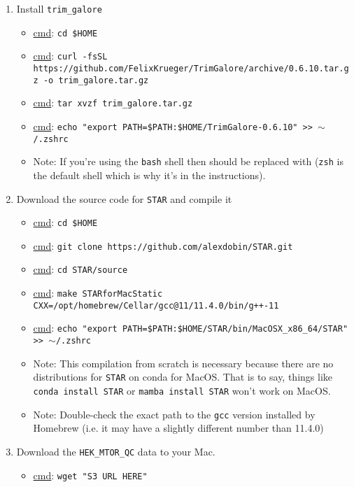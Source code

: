 \documentclass{article}
\begin{document}
\begin{enumerate}
        \item Install \texttt{trim\_galore}
        \begin{itemize}
            \item \underline{cmd}: \texttt{cd \$HOME}
            \item \underline{cmd}: \texttt{curl -fsSL https://github.com/FelixKrueger/TrimGalore/archive/0.6.10.tar.gz -o trim\_galore.tar.gz}
            \item \underline{cmd}: \texttt{tar xvzf trim\_galore.tar.gz}
            \item \underline{cmd}: \texttt{echo "export PATH=\$PATH:\$HOME/TrimGalore-0.6.10" >> $\sim$/.zshrc}
            \item Note: If you're using the \texttt{bash} shell then  should be replaced with  (\texttt{zsh} is the default shell which is why it's in the instructions).
        \end{itemize}

        \item Download the source code for \texttt{STAR} and compile it
        \begin{itemize}
            \item \underline{cmd}: \texttt{cd \$HOME}
            \item \underline{cmd}: \texttt{git clone https://github.com/alexdobin/STAR.git}
            \item \underline{cmd}: \texttt{cd STAR/source}
            \item \underline{cmd}: \texttt{make STARforMacStatic CXX=/opt/homebrew/Cellar/gcc@11/11.4.0/bin/g++-11}
            \item \underline{cmd}: \texttt{echo "export PATH=\$PATH:\$HOME/STAR/bin/MacOSX\_x86\_64/STAR" >> $\sim$/.zshrc}
            \item Note: This compilation from scratch is necessary because there are no distributions for \texttt{STAR} on conda for MacOS. That is to say, things like \texttt{conda install STAR} or \texttt{mamba install STAR} won't work on MacOS.
            \item Note: Double-check the exact path to the \texttt{gcc} version installed by Homebrew (i.e. it may have a slightly different number than 11.4.0)
        \end{itemize}

        \item Download the \texttt{HEK\_MTOR\_QC} data to your Mac.
        \begin{itemize}
            \item \underline{cmd}: \texttt{wget "S3 URL HERE"}
        \end{itemize}


\end{enumerate}
\end{document}
